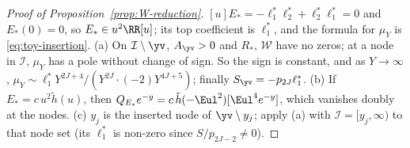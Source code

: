 \begin{proof}[Proof of Proposition~\textup{\ref{prop:W-reduction}}]
$[u]E_*=-\ell_1^*\ell_2^*+\ell_2^*\ell_1^*=0$ and $E_*(0)=0$, so $E_*\in u^2\RR[u]$; its top coefficient is $\ell_1^*$, and the
formula for $\mu_Y$ is \eqref{eq:toy-insertion}. (a) On $\mathcal I\setminus\yv$, $A_{\yv}>0$ and $R_*$, $\mathcal W$ have no
zeros; at a node in $\mathcal I$, $\mu_Y$ has a pole without change of sign. So the sign is constant, and as
$Y\to\infty$, $\mu_Y\sim\ell_1^*Y^{2J+4}/(Y^{2J}\cdot(-2)Y^{4J+5})$; finally $S_{\yv}=-p_{2J}\ell_1^*$. (b) If
$E_*=c\,u^2\tilde h(u)$, then $Q_{E_*}e^{-y}=c\,\tilde h(-\Eul^2)[\Eul^4e^{-y}]$, which vanishes doubly at the nodes.
(c) $y_j$ is the inserted node of $\yv\setminus y_j$; apply (a) with $\mathcal I=[y_j,\infty)$ to that node set (its
$\ell_1^*$ is non-zero since $S/p_{2J-2}\neq0$).
\end{proof}
